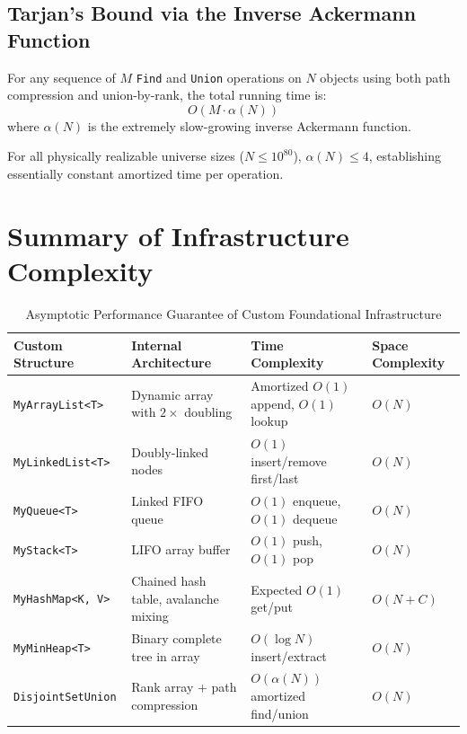 \subsection{Tarjan's Bound via the Inverse Ackermann Function}
\begin{theorem}
For any sequence of $M$ \texttt{Find} and \texttt{Union} operations on $N$ objects using both path compression and union-by-rank, the total running time is:
\begin{equation}
O(M \cdot \alpha(N))
\end{equation}
where $\alpha(N)$ is the extremely slow-growing inverse Ackermann function.
\end{theorem}
For all physically realizable universe sizes ($N \le 10^{80}$), $\alpha(N) \le 4$, establishing essentially constant amortized time per operation.

\section{Summary of Infrastructure Complexity}
\begin{table}[H]
\centering
\begin{tabularx}{\textwidth}{lXll}
\toprule
\textbf{Custom Structure} & \textbf{Internal Architecture} & \textbf{Time Complexity} & \textbf{Space Complexity} \\
\midrule
\texttt{MyArrayList<T>} & Dynamic array with $2\times$ doubling & Amortized $O(1)$ append, $O(1)$ lookup & $O(N)$ \\
\texttt{MyLinkedList<T>} & Doubly-linked nodes & $O(1)$ insert/remove first/last & $O(N)$ \\
\texttt{MyQueue<T>} & Linked FIFO queue & $O(1)$ enqueue, $O(1)$ dequeue & $O(N)$ \\
\texttt{MyStack<T>} & LIFO array buffer & $O(1)$ push, $O(1)$ pop & $O(N)$ \\
\texttt{MyHashMap<K, V>} & Chained hash table, avalanche mixing & Expected $O(1)$ get/put & $O(N + C)$ \\
\texttt{MyMinHeap<T>} & Binary complete tree in array & $O(\log N)$ insert/extract & $O(N)$ \\
\texttt{DisjointSetUnion} & Rank array + path compression & $O(\alpha(N))$ amortized find/union & $O(N)$ \\
\bottomrule
\end{tabularx}
\caption{Asymptotic Performance Guarantee of Custom Foundational Infrastructure}
\label{tab:core_structures_summary}
\end{table}
